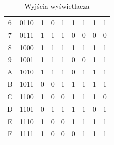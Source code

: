 \documentclass{article}
\begin{document}
\begin{center}
\begin{table}[ht]
\begin{tabularx}{\textwidth}{|c|c| *{7}{Y|}}
                         6 & 0110 & 1 & 0 & 1 & 1 & 1 & 1 & 1\\
                         7 & 0111 & 1 & 1 & 1 & 0 & 0 & 0 & 0\\
                         8 & 1000 & 1 & 1 & 1 & 1 & 1 & 1 & 1\\
                         9 & 1001 & 1 & 1 & 1 & 0 & 0 & 1 & 1\\
                         A & 1010 & 1 & 1 & 1 & 0 & 1 & 1 & 1\\
                         B & 1011 & 0 & 0 & 1 & 1 & 1 & 1 & 1\\ 
                         C & 1100 & 1 & 0 & 0 & 1 & 1 & 1 & 0\\
                         D & 1101 & 0 & 1 & 1 & 1 & 1 & 0 & 1\\
                         E & 1110 & 1 & 0 & 0 & 1 & 1 & 1 & 1\\
                         F & 1111 & 1 & 0 & 0 & 0 & 1 & 1 & 1\\
                        \hline
                    \end{tabularx}
                    \caption{Wyjścia wyświetlacza}
                    \label{tab:my_label}
                \end{table}
            \end{center}
            \FloatBarrier
            
\end{document}
